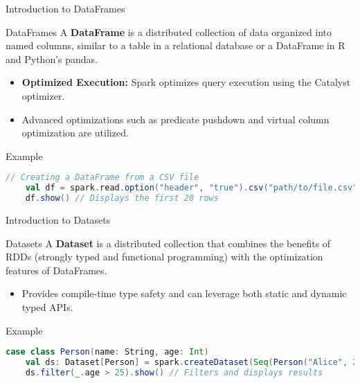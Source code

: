 \documentclass[aspectratio=169]{beamer}
\begin{document}
\begin{frame}[fragile]{Introduction to DataFrames}
    \begin{block}{DataFrames}
        A \textbf{DataFrame} is a distributed collection of data organized into named columns, similar to a table in a relational database or a DataFrame in R and Python's pandas.
    \end{block}

    \begin{itemize}
        \item \textbf{Optimized Execution:} Spark optimizes query execution using the Catalyst optimizer.
        \item Advanced optimizations such as predicate pushdown and virtual column optimization are utilized.
    \end{itemize}

    \begin{block}{Example}
    \begin{lstlisting}[language=Scala]
    // Creating a DataFrame from a CSV file
    val df = spark.read.option("header", "true").csv("path/to/file.csv")
    df.show() // Displays the first 20 rows
    \end{lstlisting}
    \end{block}
\end{frame}

\begin{frame}[fragile]{Introduction to Datasets}
    \begin{block}{Datasets}
        A \textbf{Dataset} is a distributed collection that combines the benefits of RDDs (strongly typed and functional programming) with the optimization features of DataFrames.
    \end{block}

    \begin{itemize}
        \item Provides compile-time type safety and can leverage both static and dynamic typed APIs.
    \end{itemize}

    \begin{block}{Example}
    \begin{lstlisting}[language=Scala]
    case class Person(name: String, age: Int)
    val ds: Dataset[Person] = spark.createDataset(Seq(Person("Alice", 25), Person("Bob", 30)))
    ds.filter(_.age > 25).show() // Filters and displays results
    \end{lstlisting}
    \end{block}
\end{frame}
\end{document}
